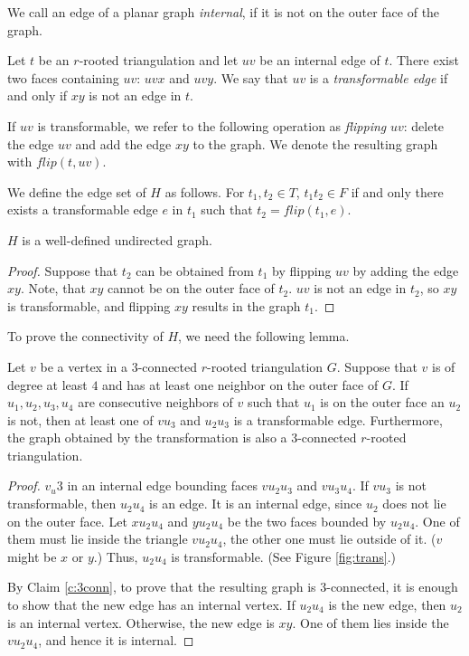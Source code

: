 \begin{definition}
  We call an edge of a planar graph \emph{internal}, if it is not on the outer face of the graph.

  Let $t$ be an $r$-rooted triangulation and let $uv$ be an internal edge of $t$. There exist two
  faces containing $uv$: $uvx$ and $uvy$. We say that $uv$ is a \emph{transformable edge}
  if and only if $xy$ is not an edge in $t$.

  If $uv$ is transformable, we refer to the following operation as \emph{flipping} $uv$:
  delete the edge $uv$ and add the edge $xy$ to the graph. We denote the resulting
  graph with $flip(t, uv)$.

  We define the edge set of $H$ as follows. For $t_1, t_2 \in T$, $t_1t_2 \in F$ if and only
  there exists a transformable edge $e$ in $t_1$ such that $t_2 = flip(t_1, e)$.
\end{definition}

\begin{remark}
  $H$ is a well-defined undirected graph.
\end{remark}
\begin{proof}
  Suppose that $t_2$ can be obtained from $t_1$ by flipping
  $uv$ by adding the edge $xy$. Note, that $xy$ cannot be on the outer face of $t_2$.
  $uv$ is not an edge in $t_2$, so $xy$ is transformable, and flipping $xy$ results
  in the graph $t_1$.
\end{proof}

To prove the connectivity of $H$, we need the following lemma.

\begin{lemma} \label{l:trans}
  Let $v$ be a vertex in a $3$-connected $r$-rooted triangulation $G$. Suppose that $v$ is of degree
  at least $4$ and has at least one neighbor on the outer face of $G$. If $u_1, u_2, u_3, u_4$
  are consecutive neighbors of $v$ such that $u_1$ is on the outer face an $u_2$
  is not, then at least one of $vu_3$ and $u_2u_3$ is a transformable edge. Furthermore,
  the graph obtained by the transformation is also a $3$-connected $r$-rooted triangulation.
\end{lemma}
\begin{proof}
  $v_u3$ in an internal edge bounding faces $vu_2u_3$ and $vu_3u_4$. If $vu_3$
  is not transformable, then $u_2u_4$ is an edge. It is an internal edge, since $u_2$
  does not lie on the outer face. Let $xu_2u_4$ and $yu_2u_4$
  be the two faces bounded by $u_2u_4$. One of them must lie inside the triangle $vu_2u_4$,
  the other one must lie outside of it. ($v$ might be $x$ or $y$.) Thus, $u_2u_4$
  is transformable. (See Figure \ref{fig:trans}.)

  By Claim \ref{c:3conn}, to prove that the resulting graph is $3$-connected, it
  is enough to show that the new edge has an internal vertex.
  If $u_2u_4$ is the new edge, then $u_2$ is an internal
  vertex. Otherwise, the new edge is $xy$. One of them lies inside the $vu_2u_4$,
  and hence it is internal.
\end{proof}


